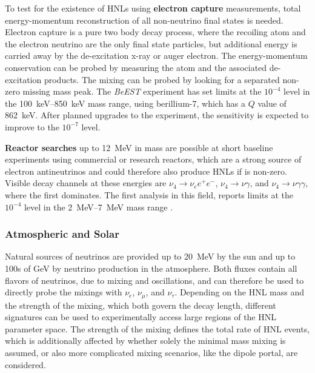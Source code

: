 To test for the existence of HNLs using \textbf{electron capture} measurements, total energy-momentum reconstruction of all non-neutrino final states is needed. Electron capture is a pure two body decay process, where the recoiling atom and the electron neutrino are the only final state particles, but additional energy is carried away by the de-excitation x-ray or auger electron. The energy-momentum conservation can be probed by measuring the atom and the associated de-excitation products. The mixing  can be probed by looking for a separated non-zero missing mass peak. The \textit{BeEST} experiment has set limits at the $10^{-4}$ level in the \SIrange{100}{850}{\kilo\electronvolt} mass range, using berillium-7, which has a $Q$ value of \SI{862}{\kilo\electronvolt}. After planned upgrades to the experiment, the sensitivity is expected to improve to the $10^{-7}$ level.

\textbf{Reactor searches} up to \SI{12}{\mega\electronvolt} in mass are possible at short baseline experiments using commercial or research reactors, which are a strong source of electron antineutrinos and could therefore also produce HNLs if  is non-zero. Visible decay channels at these energies are $\nu_4 \rightarrow \nu_e e^+ e^-$, $\nu_4 \rightarrow \nu \gamma$, and $\nu_4 \rightarrow \nu \gamma \gamma$, where the first dominates. The first analysis in this field, reports limits at the $10^{-4}$ level in the \SIrange{2}{7}{\mega\electronvolt} mass range .



\subsubsection{Atmospheric and Solar}

Natural sources of neutrinos are provided up to \SI{20}{\mega\electronvolt} by the sun and up to 100s of \si{\giga\electronvolt} by neutrino production in the atmosphere. Both fluxes contain all flavors of neutrinos, due to mixing and oscillations, and can therefore be used to directly probe the mixings with $\nu_e$, $\nu_\mu$, and $\nu_\tau$. Depending on the HNL mass and the strength of the mixing, which both govern the decay length, different signatures can be used to experimentally access large regions of the HNL parameter space. The strength of the mixing defines the total rate of HNL events, which is additionally affected by whether solely the minimal mass mixing is assumed, or also more complicated mixing scenarios, like the dipole portal, are considered.

